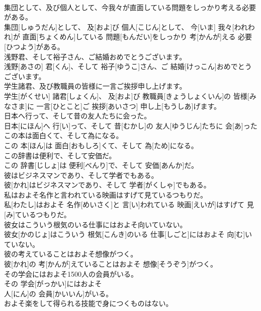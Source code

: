 \documentclass[8pt]{extreport}
\begin{document}
\begin{CJK}{UTF8}{min}
\\	集団として、及び個人として、今我々が直面している問題をしっかり考える必要がある。	
\\	集団[しゅうだん]として、 及[およ]び 個人[こじん]として、 今[いま] 我々[われわれ]が 直面[ちょくめん]している 問題[もんだい]をしっかり 考[かんが]える 必要[ひつよう]がある。
\\	浅野君、そして裕子さん、ご結婚おめでとうございます。	
\\	浅野[あさの] 君[くん]、そして 裕子[ゆうこ]さん、ご 結婚[けっこん]おめでとうございます。
\\	学生諸君、及び教職員の皆様に一言ご挨拶申し上げます。	
\\	学生[がくせい] 諸君[しょくん]、 及[およ]び 教職員[きょうしょくいん]の 皆様[みなさま]に 一言[ひとこと]ご 挨拶[あいさつ] 申し上[もうしあ]げます。
\\	日本へ行って、そして昔の友人たちに会った。	
\\	日本[にほん]へ 行[い]って、そして 昔[むかし]の 友人[ゆうじん]たちに 会[あ]った
\\	この本は面白くて、そして為になる。	
\\	この 本[ほん]は 面白[おもしろ]くて、そして 為[ため]になる。
\\	この辞書は便利で、そして安価だ。	
\\	この 辞書[じしょ]は 便利[べんり]で、そして 安価[あんか]だ。
\\	彼はビジネスマンであり、そして学者でもある。	
\\	彼[かれ]はビジネスマンであり、そして 学者[がくしゃ]でもある。
\\	私はおよそ名作と言われている映画はすげて見ているつもりだ。	
\\	私[わたし]はおよそ 名作[めいさく]と 言[い]われている 映画[えいが]はすげて 見[み]ているつもりだ。
\\	彼女はこういう根気のいる仕事にはおよそ向いていない。	
\\	彼女[かのじょ]はこういう 根気[こんき]のいる 仕事[しごと]にはおよそ 向[む]いていない。
\\	彼の考えていることはおよそ想像がつく。	
\\	彼[かれ]の 考[かんが]えていることはおよそ 想像[そうぞう]がつく。
\\	その学会にはおよそ1500人の会員がいる。	
\\	その 学会[がっかい]にはおよそ 
\\	人[にん]の 会員[かいいん]がいる。
\\	およそ楽をして得られる技能で身につくものはない。	

\end{CJK}
\end{document}
